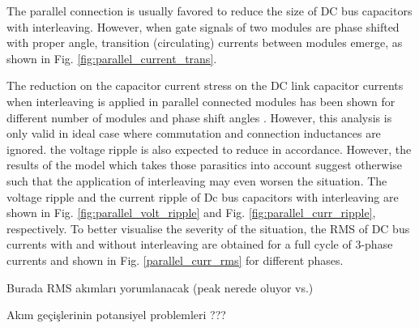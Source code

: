 The parallel connection is usually favored to reduce the size of DC bus capacitors with interleaving. However, when gate signals of two modules are phase shifted with proper angle, transition (circulating) currents between modules emerge, as shown in Fig. \ref{fig:parallel_current_trans}.



The reduction on the capacitor current stress on the DC link capacitor currents when interleaving is applied in parallel connected modules has been shown for different number of modules and phase shift angles \cite{Ugur2017}. However, this analysis is only valid in ideal case where commutation and connection inductances are ignored. the voltage ripple is also expected to reduce in accordance. However, the results of the model which takes those parasitics into account suggest otherwise such that the application of interleaving may even worsen the situation. The voltage ripple and the current ripple of Dc bus capacitors with interleaving are shown in Fig. \ref{fig:parallel_volt_ripple} and Fig. \ref{fig:parallel_curr_ripple}, respectively. To better visualise the severity of the situation, the RMS of DC bus currents with and without interleaving are obtained for a full cycle of 3-phase currents and shown in Fig. \ref{parallel_curr_rms} for different phases.

Burada RMS akımları yorumlanacak (peak nerede oluyor vs.)

Akım geçişlerinin potansiyel problemleri ???

